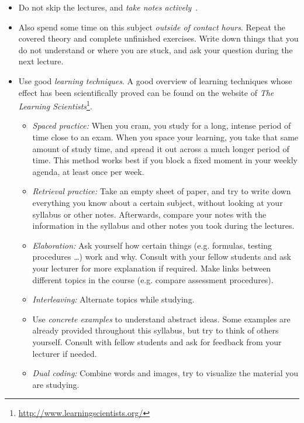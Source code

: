 \begin{itemize}
    \item Do not skip the lectures, and \emph{take notes actively}~\parencite{Lundin2020}.
    \item Also spend some time on this subject \emph{outside of contact hours}. Repeat the covered theory and complete unfinished exercises.
    Write down things that you do not understand or where you are stuck, and ask your question during the next lecture.
    \item Use good \emph{learning techniques}. A good overview of learning techniques whose effect has been scientifically proved can be found on the website of \emph{The Learning Scientists}\footnote{\url{http://www.learningscientists.org/}}.
    \begin{itemize}
        \item \emph{Spaced practice:} When you cram, you study for a long, intense period of time close to an exam. When you space your learning, you take that same amount of study time, and spread it out across a much longer period of time.
        This method works best if you block a fixed moment in your weekly agenda, at least once per week.
        \item \emph{Retrieval practice:} Take an empty sheet of paper, and try to write down everything you know about a certain subject,
        without looking at your syllabus or other notes. Afterwards, compare your notes with the information in the syllabus and other notes you took during the lectures.
        \item \emph{Elaboration:} Ask yourself how certain things (e.g. formulas, testing procedures \ldots) work and why. Consult with your fellow students and ask your lecturer for more explanation if required. Make links between different topics in the course (e.g. compare assessment procedures).
        \item \emph{Interleaving:} Alternate topics while studying.
        \item Use \emph{concrete examples} to understand abstract ideas.
        Some examples are already provided throughout this syllabus, but try to think of others yourself. Consult with fellow students and ask for feedback from your lecturer if needed.
        
        \item \emph{Dual coding:} Combine words and images, try to visualize the material you are studying.
    \end{itemize}
\end{itemize}

